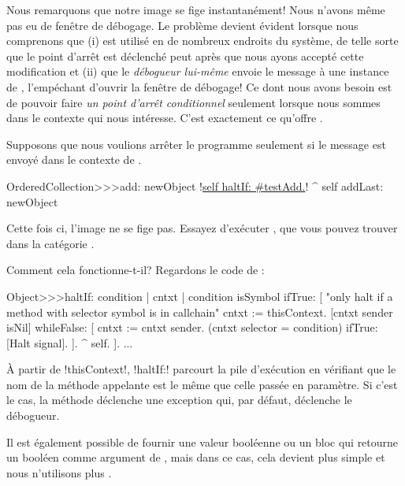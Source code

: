 \documentclass[a4paper,10pt,twoside]{book}
\begin{document}
Nous remarquons que notre image se fige instantanément! Nous n'avons même pas eu de fenêtre de débogage.
Le problème devient évident lorsque nous comprenons que (i)  est utilisé en de nombreux endroits du système, de telle sorte que le point d'arrêt est déclenché peut après que nous ayons accepté cette modification et (ii) que le \emph{débogueur lui-même} envoie le message  à une instance de , l'empéchant d'ouvrir la fenêtre de débogage!
Ce dont nous avons besoin est de pouvoir faire \emph{un point d'arrêt conditionnel} seulement lorsque nous sommes dans le contexte qui nous intéresse.
C'est exactement ce qu'offre .

Supposons que nous voulions arrêter le programme seulement si le message  est envoyé dans le contexte de .


\begin{code}{}
OrderedCollection>>>add: newObject
	!\underline{self haltIf: \#testAdd.}!
	^ self addLast: newObject
\end{code}

Cette fois ci, l'image ne se fige pas. Essayez d'exécuter \mbox{,} que vous pouvez trouver dans la catégorie \mbox{.}

\noindent{} Comment cela fonctionne-t-il? Regardons le code de \mbox{:}
\begin{code}{}
Object>>>haltIf: condition
	| cntxt |
	condition isSymbol ifTrue: [
		"only halt if a method with selector symbol is in callchain"
		cntxt := thisContext.
		[cntxt sender isNil] whileFalse: [
			cntxt := cntxt sender. 
			(cntxt selector = condition) ifTrue: [Halt signal]. ].
		^ self.
	].
	...
\end{code}

À partir de \ct!thisContext!, \ct!haltIf:! parcourt la pile d'exécution en vérifiant que le nom de la méthode appelante est le même que celle passée en paramètre. Si c'est le cas, la méthode déclenche une exception qui, par défaut, déclenche le débogueur.

Il est également possible de fournir une valeur booléenne ou un bloc qui retourne un booléen comme argument de , mais dans ce cas, cela devient plus simple et nous n'utilisons plus .
\end{document}

